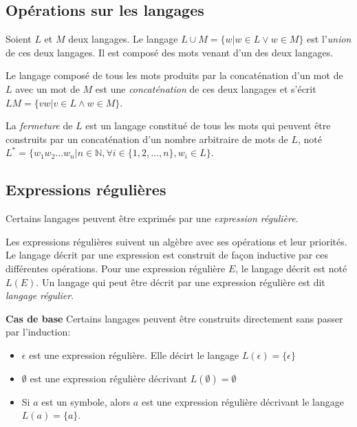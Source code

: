 \subsection{Opérations sur les langages}

Soient $L$ et $M$ deux langages. Le langage $L \cup M = \{w | w \in L\vee w \in M\}$ est l'\emph{union} de ces deux langages. Il est composé des mots venant d'un des deux langages.

Le langage composé de tous les mots produits par la concaténation d'un mot de $L$ avec un mot de $M$ est une \emph{concaténation} de ces deux langages et s'écrit $LM = \{vw | v \in L \wedge w \in M\}$.

La \emph{fermeture} de $L$ est un langage constitué de tous les mots qui peuvent être construits par un concaténation d'un nombre arbitraire de mots de $L$, noté $L^*=\{w_1w_2\dots w_n|n\in \mathbb{N},\forall i \in \{1,2,\dots,n\}, w_i \in L\}$.


\subsection{Expressions régulières}\label{ss:regex}

Certains langages peuvent être exprimés par une \emph{expression régulière}.

Les expressions régulières suivent un algèbre avec ses opérations et leur priorités. Le langage décrit par une expression est construit de façon inductive par ces différentes opérations. Pour une expression régulière $E$, le langage décrit est noté $L(E)$. Un langage qui peut être décrit par une expression régulière est dit \emph{langage régulier}.


\textbf{Cas de base}
Certains langages peuvent être construits directement sans passer par l'induction:

\begin{itemize}
	\item $\epsilon$ est une expression régulière. Elle décirt le langage $L(\epsilon)=\{\epsilon\}$
	\item $\emptyset$ est une expression régulière décrivant $L(\emptyset)=\emptyset$
	\item Si $a$ est un symbole, alors $a$ est une expression régulière décrivant le langage $L(a) = \{a\}$.
\end{itemize}


